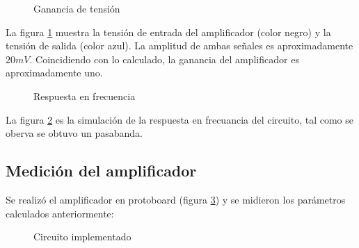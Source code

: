 \documentclass[../../main.tex]{subfiles}
\begin{document}
\begin{figure}[H]	
	\centering
	\caption{Ganancia de tensión}\label{fig:simgain}
\end{figure}
La figura \ref{fig:simgain} muestra la tensión de entrada del amplificador (color negro) y la tensión de salida (color azul). La amplitud de ambas señales es aproximadamente $20mV$. Coincidiendo con lo calculado, la ganancia del amplificador es aproximadamente uno.

\begin{figure}[H]	
	\centering
	\caption{Respuesta en frecuencia}\label{fig:simrtafrec}
\end{figure}
La figura \ref{fig:simrtafrec} es la simulación de la respuesta en frecuancia del circuito, tal como se oberva se obtuvo un pasabanda.

\subsection{Medición del amplificador}
Se realizó el amplificador en protoboard (figura \ref{fig:pro}) y se midieron los par\'ametros calculados anteriormente:

\begin{figure}[H]	
	\centering
	\caption{Circuito implementado}\label{fig:pro}
\end{figure}
\end{document}

